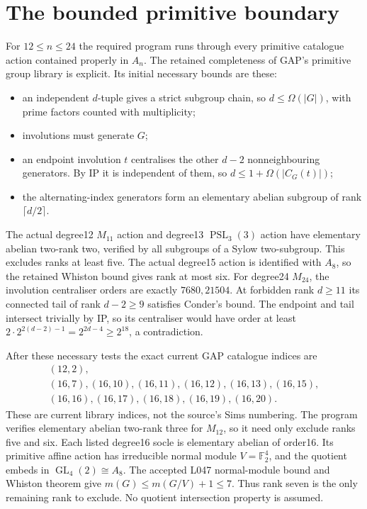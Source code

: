 \documentclass[11pt,a4paper]{article}
\begin{document}
\section*{The bounded primitive boundary}
For $12\leq n\leq24$ the required program runs through every
primitive catalogue action contained properly in $A_n$. The
retained completeness of GAP's primitive group library is explicit.
Its initial necessary bounds are these:
\begin{itemize}
\item an independent $d$-tuple gives a strict subgroup chain, so
$d\leq\Omega(|G|)$, with prime factors counted with multiplicity;
\item involutions must generate $G$;
\item an endpoint involution $t$ centralises the other $d-2$
nonneighbouring generators. By IP it is independent of them,
so $d\leq1+\Omega(|C_G(t)|)$;
\item the alternating-index generators form an elementary abelian
subgroup of rank $\lceil d/2\rceil$.
\end{itemize}
The actual degree12 $M_{11}$ action and degree13 $\operatorname{PSL}_3(3)$
action have elementary abelian two-rank two, verified by all subgroups
of a Sylow two-subgroup. This excludes ranks at least five. The
actual degree15 action is identified with $A_8$, so the retained
Whiston bound gives rank at most six. For degree24 $M_{24}$, the
involution centraliser orders are exactly $7680,21504$. At forbidden
rank $d\ge11$ its connected tail of rank $d-2\ge9$ satisfies
Conder's bound. The endpoint and tail intersect trivially by IP,
so its centraliser would have order at least
$2\cdot2^{2(d-2)-1}=2^{2d-4}\ge2^{18}$, a contradiction.

After these necessary tests the exact current GAP catalogue indices
are
\[
\begin{gathered}
 (12,2),\\
 (16,7),(16,10),(16,11),(16,12),(16,13),(16,15),\\
 (16,16),(16,17),(16,18),(16,19),(16,20).
\end{gathered}
\]
These are current library indices, not the source's Sims numbering.
The program verifies elementary abelian two-rank three for $M_{12}$,
so it need only exclude ranks five and six. Each listed degree16
socle is elementary abelian of order16. Its primitive affine action
has irreducible normal module $V=\mathbb F_2^4$, and the quotient
embeds in $\operatorname{GL}_4(2)\cong A_8$. The accepted L047
normal-module bound and Whiston theorem give
$m(G)\le m(G/V)+1\le7$. Thus rank seven is the only remaining
rank to exclude. No quotient intersection property is assumed.
\end{document}
